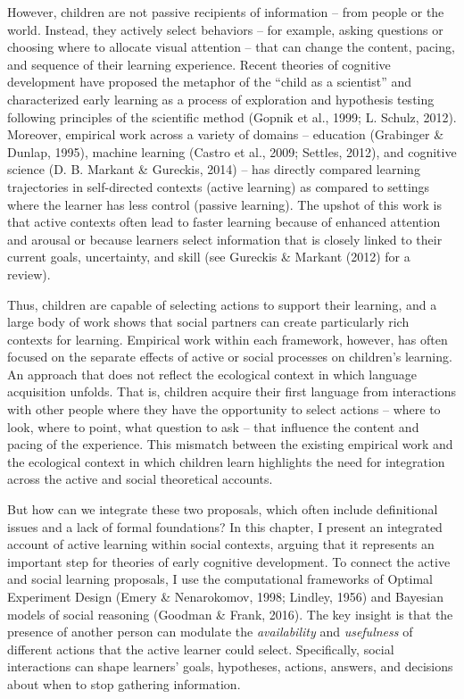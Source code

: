 \documentclass[oneside]{report}
\begin{document}
However, children are not passive recipients of information -- from
people or the world. Instead, they actively select behaviors -- for
example, asking questions or choosing where to allocate visual attention
-- that can change the content, pacing, and sequence of their learning
experience. Recent theories of cognitive development have proposed the
metaphor of the ``child as a scientist'' and characterized early
learning as a process of exploration and hypothesis testing following
principles of the scientific method (Gopnik et al., 1999; L. Schulz,
2012). Moreover, empirical work across a variety of domains -- education
(Grabinger \& Dunlap, 1995), machine learning (Castro et al., 2009;
Settles, 2012), and cognitive science (D. B. Markant \& Gureckis, 2014)
-- has directly compared learning trajectories in self-directed contexts
(active learning) as compared to settings where the learner has less
control (passive learning). The upshot of this work is that active
contexts often lead to faster learning because of enhanced attention and
arousal or because learners select information that is closely linked to
their current goals, uncertainty, and skill (see Gureckis \& Markant
(2012) for a review).

Thus, children are capable of selecting actions to support their
learning, and a large body of work shows that social partners can create
particularly rich contexts for learning. Empirical work within each
framework, however, has often focused on the separate effects of active
or social processes on children's learning. An approach that does not
reflect the ecological context in which language acquisition unfolds.
That is, children acquire their first language from interactions with
other people where they have the opportunity to select actions -- where
to look, where to point, what question to ask -- that influence the
content and pacing of the experience. This mismatch between the existing
empirical work and the ecological context in which children learn
highlights the need for integration across the active and social
theoretical accounts.

But how can we integrate these two proposals, which often include
definitional issues and a lack of formal foundations? In this chapter, I
present an integrated account of active learning within social contexts,
arguing that it represents an important step for theories of early
cognitive development. To connect the active and social learning
proposals, I use the computational frameworks of Optimal Experiment
Design (Emery \& Nenarokomov, 1998; Lindley, 1956) and Bayesian models
of social reasoning (Goodman \& Frank, 2016). The key insight is that
the presence of another person can modulate the \emph{availability} and
\emph{usefulness} of different actions that the active learner could
select. Specifically, social interactions can shape learners' goals,
hypotheses, actions, answers, and decisions about when to stop gathering
information.
\end{document}
